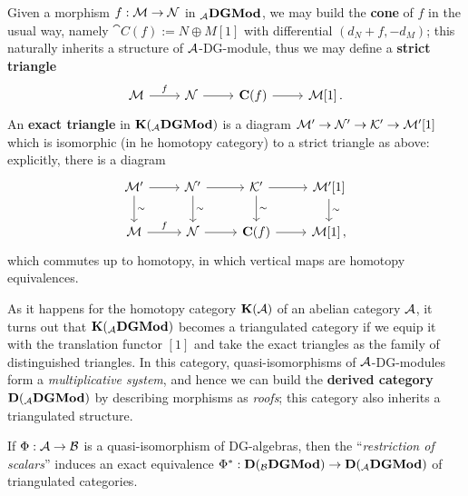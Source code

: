 	Given a morphism $f:\mathcal{M} \to \mathcal{N}$ in ${}_{\mathcal{A}}{\normalfont\textbf{DGMod}}$,
	we may build the \textbf{cone} of $f$ in the usual way, namely
	$\cat{C}(f) := N \oplus M[1]$ with differential $(d_{N} + f, -d_{M})$;
	this naturally inherits a structure of $\mathcal{A}$-DG-module,
	thus we may define a \textbf{strict triangle}
	\begin{equation*}
		\begin{tikzcd}
			\Mm \ar[r, "f"] & \Nn \ar[r] & \cat{C}(f) \ar[r] & \Mm{[1]}\,.
		\end{tikzcd}
	\end{equation*}
	An \textbf{exact triangle} in ${\normalfont\textbf{K}}({}_{\mathcal{A}}{\normalfont\textbf{DGMod}})$
	is a diagram $\mathcal{M}' \to \mathcal{N}' \to \mathcal{K}' \to \mathcal{M}'[1]$
	which is isomorphic (in he homotopy category) to a strict
	triangle as above: explicitly, there is a diagram
	\begin{equation*}
		\begin{tikzcd}
			\Mm' \ar[r] \ar[d, "\sim"] & \Nn' \ar[r] \ar[d, "\sim"] & \Kk' \ar[r] \ar[d, "\sim"] & \Mm'{[1]} \ar[d, "\sim"] \\
			\Mm \ar[r, "f"] & \Nn \ar[r] & \cat{C}(f) \ar[r] & \Mm{[1]}\,,
		\end{tikzcd}
	\end{equation*}
	which commutes up to homotopy, in which vertical maps are homotopy equivalences.
	
	As it happens for the homotopy category ${\normalfont\textbf{K}}(\mathcal{A})$ of an abelian category $\mathcal{A}$,
	it turns out that ${\normalfont\textbf{K}}({}_{\mathcal{A}}{\normalfont\textbf{DGMod}})$ becomes a triangulated category 
	if we equip it with
	the translation functor $[1]$ and take the exact triangles as the family
	of distinguished triangles. In this category, quasi-isomorphisms of $\mathcal{A}$-DG-modules
	form a \emph{multiplicative system}, and hence we can 
	build the \textbf{derived category} ${\normalfont\textbf{D}}({}_{\mathcal{A}}{\normalfont\textbf{DGMod}})$
	by describing morphisms as \emph{roofs}; this category also inherits
	a triangulated structure.
	
	\begin{thm}
		If $\Phi:\mathcal{A} \to \mathcal{B}$ is a quasi-isomorphism of DG-algebras,
		then the ``\emph{restriction of scalars}'' induces an exact equivalence
		$\Phi^*: {\normalfont\textbf{D}}({}_{\mathcal{B}}{\normalfont\textbf{DGMod}}) \to {\normalfont\textbf{D}}({}_{\mathcal{A}}{\normalfont\textbf{DGMod}})$ 
		of triangulated categories.
	\end{thm}
	
	
	
	
	
	
	
	
	
	
	
	
	
	
	
	
	